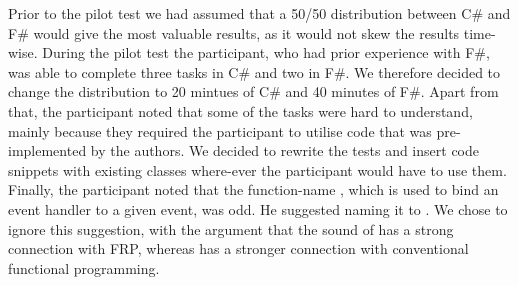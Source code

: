Prior to the pilot test we had assumed that a 50/50 distribution between C\# and F\# would give the most valuable results, as it would not skew the results time-wise. During the pilot test the participant, who had prior experience with F\#, was able to complete three tasks in C\# and two in F\#. We therefore decided to change the distribution to 20 mintues of C\# and 40 minutes of F\#. Apart from that, the participant noted that some of the tasks were hard to understand, mainly because they required the participant to utilise code that was pre-implemented by the authors. We decided to rewrite the tests and insert code snippets with existing classes where-ever the participant would have to use them. Finally, the participant noted that the function-name , which is used to bind an event handler to a given event, was odd. He suggested naming it to . We chose to ignore this suggestion, with the argument that the sound of  has a strong connection with \gls{FRP}, whereas  has a stronger connection with conventional functional programming.